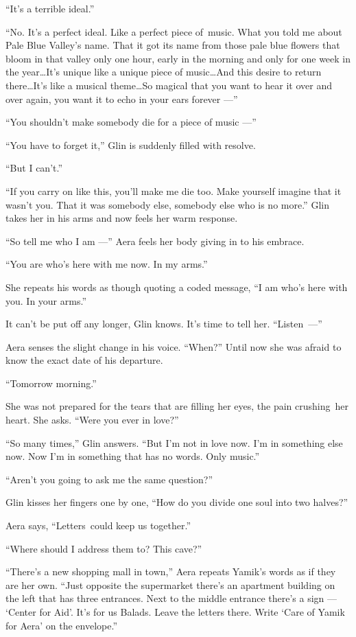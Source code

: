 \documentclass[twoside,11pt]{book}
\begin{document}
``It's a terrible ideal.''

``No. It's a perfect ideal. Like a perfect piece of~music. What you told me about Pale Blue Valley's name.
That it got its name from those pale blue flowers that bloom in that valley only one hour, early in the morning and
only for one week in the year{\ldots}It's unique like a unique piece of
music{\ldots}And this desire to return there{\ldots}It's
like a musical theme{\ldots}So magical that you want to hear it over and over again, you want it to echo in your
ears forever ---''

``You shouldn't make somebody die for a piece of music ---''

``You have to forget it,'' Glin is suddenly filled with resolve.

``But I can't.''

``If you carry on like this, you'll make me die too.
Make{ }yourself{ }imagine that it wasn't you. That it was somebody else, somebody else
who is no more.'' Glin takes her in his arms and now feels her warm response.

``So tell me who I am ---'' Aera feels her body giving in to his embrace.

``You are who's here with me now. In my arms.''

She repeats his words as though quoting a coded message, ``I am who's here with you. In your
arms.''

It can't be put off any longer, Glin knows. It's time to tell her.
\hbox{``Listen ---''}

Aera senses the slight change in his voice. ``When?'' Until now she was afraid to know the
exact date of his departure.

``Tomorrow morning.''

She was not prepared for the tears that are filling her eyes, the pain crushing~her heart. She asks. ``Were
you ever in love?''

``So many times,'' Glin answers. ``But I'm not in love now. I'm in something else
now. Now I'm in something that has no words. Only music.''

``Aren't you going to ask me the same question?''

Glin kisses her fingers one by one, ``How do you divide one soul into two halves?''

Aera says, ``Letters~could keep us together.''

``Where should I address them to? This cave?''

``There's a new shopping mall in town,'' Aera repeats Yamik's words as if they are her own.
``Just opposite the supermarket there's an apartment building on the left that has three entrances. Next
to the middle entrance there's a sign --- `Center for Aid'. It's for us Balads. Leave the letters there. Write `Care of
Yamik for Aera' on the envelope.''
\end{document}
